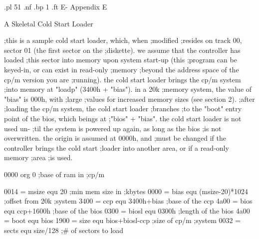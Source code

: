.pl 51
.nf
.bp 1
.ft                                                       E-%
                                        Appendix E

                               A Skeletal Cold Start Loader



                                  ;this is a sample cold start loader, which, when
                                  ;modified
                                  ;resides on track 00, sector 01 (the first sector on the
                                  ;diskette). we assume that the controller has loaded
                                  ;this sector into memory upon system start-up (this
                                  ;program can be keyed-in, or can exist in read-only
                                  ;memory
                                  ;beyond the address space of the cp/m version you are
                                  ;running). the cold start loader brings the cp/m system
                                  ;into memory at "loadp" (3400h + "bias"). in a 20k
                                  ;memory system, the value of "bias" is 000h, with
                                  ;large
                                  ;values for increased memory sizes (see section 2).
                                  ;after
                                  ;loading the cp/m system, the cold start loader
                                  ;branches
                                  ;to the "boot" entry point of the bios, which beings at
                                  ;"bios" + "bias". the cold start loader is not used un-
                                  ;til the system is powered up again, as long as the bios
                                  ;is not overwritten. the origin is assumed at 0000h, and
                                  ;must be changed if the controller brings the cold start
                                  ;loader into another area, or if a read-only memory
                                  ;area
                                  ;is used.

0000                                        org 0                  ;base of ram in
                                                                   ;cp/m

0014 =                            msize     equ 20                 ;min mem size in
                                                                   ;kbytes
0000 =                            bias      equ (msize-20)*1024    ;offset from 20k
                                                                   ;system
3400 =                            ccp       equ 3400h+bias         ;base of the ccp
4a00 =                            bios      equ ccp+1600h          ;base of the bios
0300 =                            biosl     equ 0300h              ;length of the bios
4a00 =                            boot      equ bios
1900 =                            size      equ bios+biosl-ccp     ;size of cp/m
                                                                   ;system
0032 =                            sects     equ size/128           ;# of sectors to load

